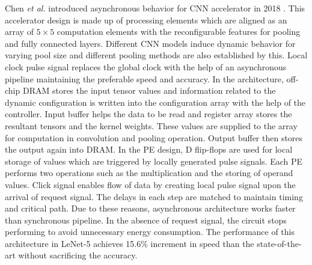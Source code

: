 \documentclass[journal]{IEEEtran}
\begin{document}
\par Chen \textit{et al.} introduced asynchronous behavior for CNN accelerator in 2018 \cite{paper28}. This accelerator design is made up of processing elements which are aligned as an array of $5\times5$ computation elements with the reconfigurable features for pooling and fully connected layers.  Different CNN models induce dynamic behavior for varying pool size and different pooling methods are also established by this. Local clock pulse signal replaces the global clock with the help of an asynchronous pipeline maintaining the preferable speed and accuracy. In the architecture, off-chip DRAM stores the input tensor values and information related to the dynamic configuration is written into the configuration array with the help of the controller. Input buffer helps the data to be read and register array stores the resultant tensors and the kernel weights. These values are supplied to the array for computation in convolution and pooling operation. Output buffer then stores the output again into DRAM. In the PE design, D flip-flops are used for local storage of values which are triggered by locally generated pulse signals. Each PE performs two operations such as the multiplication and the storing of operand values. Click signal enables flow of data by creating local pulse signal upon the arrival of request signal. The delays in each step are matched to maintain timing and critical path. Due to these reasons, asynchronous architecture works faster than synchronous pipeline. In the absence of request signal, the circuit stops performing to avoid unnecessary energy consumption. The performance of this architecture in LeNet-5 achieves 15.6\% increment in speed than the state-of-the-art without sacrificing the accuracy. 
\end{document}
